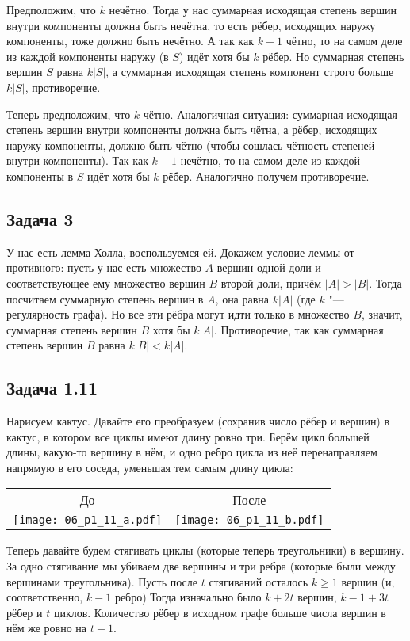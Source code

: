 	Предположим, что $k$ нечётно.
	Тогда у нас суммарная исходящая степень вершин внутри компоненты должна быть нечётна,
	то есть рёбер, исходящих наружу компоненты, тоже должно быть нечётно.
	А так как $k-1$ чётно, то на самом деле из каждой компоненты наружу (в $S$) идёт хотя бы $k$ рёбер.
	Но суммарная степень вершин $S$ равна $k|S|$, а суммарная исходящая степень компонент
	строго больше $k|S|$, противоречие.

	Теперь предположим, что $k$ чётно.
	Аналогичная ситуация: суммарная исходящая степень вершин внутри компоненты должна быть чётна,
	а рёбер, исходящих наружу компоненты, должно быть чётно (чтобы сошлась чётность степеней внутри компоненты).
	Так как $k-1$ нечётно, то на самом деле из каждой компоненты в $S$ идёт хотя бы $k$ рёбер.
	Аналогично получем противоречие.

\subsection{Задача 3}
	У нас есть лемма Холла, воспользуемся ей.
	Докажем условие леммы от противного: пусть у нас есть множество $A$ вершин одной
	доли и соответствующее ему множество вершин $B$ второй доли, причём $|A|>|B|$.
	Тогда посчитаем суммарную степень вершин в $A$, она равна $k|A|$ (где $k$ "--- регулярность графа).
	Но все эти рёбра могут идти только в множество $B$, значит, суммарная степень вершин $B$
	хотя бы $k|A|$.
	Противоречие, так как суммарная степень вершин $B$ равна $k|B|<k|A|$.

\subsection{Задача 1.11}
	Нарисуем кактус.
	Давайте его преобразуем (сохранив число рёбер и вершин) в кактус, в котором
	все циклы имеют длину ровно три.
	Берём цикл большей длины, какую-то вершину в нём, и одно ребро цикла из неё
	перенаправляем напрямую в его соседа, уменьшая тем самым длину цикла:
	\begin{center}
		\begin{tabular}{cc}
		До & После \\
		\texttt{[image: 06\_p1\_11\_a.pdf]} & \texttt{[image: 06\_p1\_11\_b.pdf]} \\
		\end{tabular}
	\end{center}

	Теперь давайте будем стягивать циклы (которые теперь треугольники) в вершину.
	За одно стягивание мы убиваем две вершины и три ребра (которые были между вершинами треугольника).
	Пусть после $t$ стягиваний осталось $k\ge 1$ вершин (и, соответственно, $k-1$ ребро)
	Тогда изначально было $k+2t$ вершин, $k-1+3t$ рёбер и $t$ циклов.
	Количество рёбер в исходном графе больше числа вершин в нём же ровно на $t-1$.

